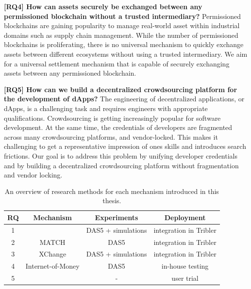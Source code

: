 \textbf{[RQ4] How can assets securely be exchanged between any permissioned blockchain without a trusted intermediary?}
Permissioned blockchains are gaining popularity to manage real-world asset within industrial domains such as supply chain management.
While the number of permissioned blockchains is proliferating, there is no universal mechanism to quickly exchange assets between different ecosystems without using a trusted intermediary.
We aim for a universal settlement mechanism that is capable of securely exchanging assets between any permissioned blockchain.

\textbf{[RQ5] How can we build a decentralized crowdsourcing platform for the development of dApps?}
The engineering of decentralized applications, or dApps, is a challenging task and requires engineers with appropriate qualifications.
Crowdsourcing is getting increasingly popular for software development.
At the same time, the credentials of developers are fragmented across many crowdsourcing platforms, and vendor-locked.
This makes it challenging to get a representative impression of ones skills and introduces search frictions.
Our goal is to address this problem by unifying developer credentials and by building a decentralized crowdsourcing platform without fragmentation and vendor locking.


\begin{table}[t]
	\small
	\centering
	\begin{tabular}{ |c|c|c|c| }
		\hline
		\textbf{RQ} & \textbf{Mechanism} & \textbf{Experiments} & \textbf{Deployment} \\ \hline
		1 & \TrustChain{} & DAS5 + simulations & integration in Tribler \\ \hline
		2 & MATCH & DAS5 & integration in Tribler \\ \hline
		3 & XChange & DAS5 + simulations & integration in Tribler \\ \hline
		4 & Internet-of-Money & DAS5 & in-house testing \\ \hline
		5 & \Dappcoder{} & - & user trial \\ \hline
	\end{tabular}
	\caption{An overview of research methods for each mechanism introduced in this thesis.}
	\label{table:research_methodology}
\end{table}

